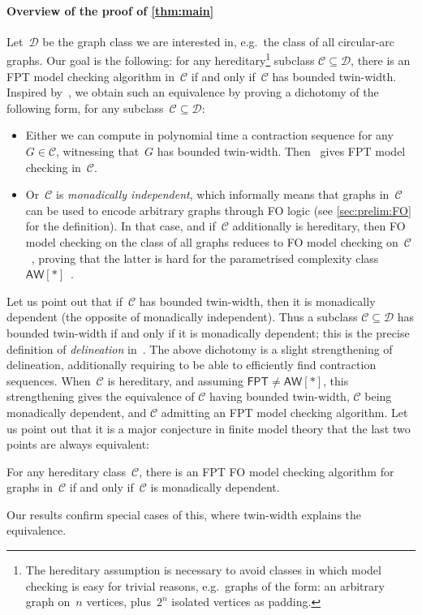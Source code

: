 \documentclass[a4paper,UKenglish,cleveref,thm-restate]{lipics-v2021}
\theoremstyle{remark}
\newcommand{\Cc}{\mathcal{C}}
\newcommand{\Dc}{\mathcal{D}}
\newcommand{\fpt}{\ensuremath{\mathsf{FPT}}\xspace}
\newcommand{\aw}{\ensuremath{\mathsf{AW}[*]}\xspace}
\begin{document}
\paragraph*{Overview of the proof of \cref{thm:main}}
Let~$\Dc$ be the graph class we are interested in, e.g.\ the class of all circular-arc graphs.
Our goal is the following:
for any hereditary\footnote{The hereditary assumption is necessary to avoid classes in which model checking is easy for trivial reasons, e.g.\ graphs of the form: an arbitrary graph on~$n$ vertices, plus~$2^n$ isolated vertices as padding.} subclass $\Cc \subseteq \Dc$, there is an FPT model checking algorithm in~$\Cc$ if and only if~$\Cc$ has bounded twin-width.
Inspired by~\cite{bonnet2022delineation,hlineny2022geometric}, we obtain such an equivalence by proving a dichotomy of the following form, for any subclass~$\Cc \subseteq \Dc$:
\begin{itemize}
    \item Either we can compute in polynomial time a contraction sequence for any $G \in \Cc$, witnessing that~$G$ has bounded twin-width.
    Then~\cite{Bonnet2022twinwidth1} gives FPT model checking in~$\Cc$.
    \item Or~$\Cc$ is \emph{monadically independent}, which informally means that graphs in~$\Cc$ can be used to encode arbitrary graphs through FO logic (see \cref{sec:prelim:FO} for the definition).
    In that case, and if~$\Cc$ additionally is hereditary, then FO model checking on the class of all graphs reduces to FO model checking on~$\Cc$~\cite{flip-breakability}, proving that the latter is hard for the parametrised complexity class \aw~\cite{downey1996queries}.
\end{itemize}
Let us point out that if~$\Cc$ has bounded twin-width, then it is monadically dependent (the opposite of monadically independent).
Thus a subclass $\Cc \subseteq \Dc$ has bounded twin-width if and only if it is monadically dependent;
this is the precise definition of \emph{delineation} in~\cite{bonnet2022delineation}.
The above dichotomy is a slight strengthening of delineation, additionally requiring to be able to efficiently find contraction sequences.
When~$\Cc$ is hereditary, and assuming $\fpt \neq \aw$, this strengthening gives the equivalence of $\Cc$ having bounded twin-width, $\Cc$ being monadically dependent, and $\Cc$ admitting an FPT model checking algorithm.
Let us point out that it is a major conjecture in finite model theory that the last two points are always equivalent:
\begin{conjecture}
    For any hereditary class~$\Cc$, there is an FPT FO model checking algorithm for graphs in~$\Cc$ if and only if~$\Cc$ is monadically dependent.
\end{conjecture}
Our results confirm special cases of this, where twin-width explains the equivalence.
\end{document}
